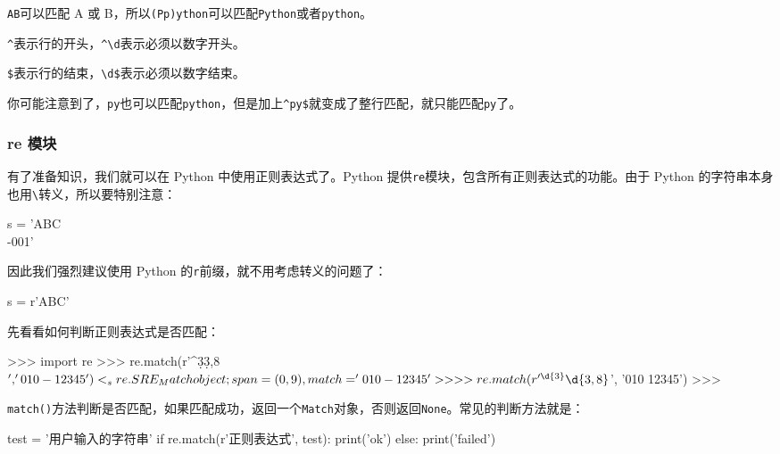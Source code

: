 \texttt{A\textbar{}B}可以匹配 A 或
B，所以\texttt{(P\textbar{}p)ython}可以匹配\texttt{\textquotesingle{}Python\textquotesingle{}}或者\texttt{\textquotesingle{}python\textquotesingle{}}。

\texttt{\^{}}表示行的开头，\texttt{\^{}\textbackslash{}d}表示必须以数字开头。

\texttt{\$}表示行的结束，\texttt{\textbackslash{}d\$}表示必须以数字结束。

你可能注意到了，\texttt{py}也可以匹配\texttt{\textquotesingle{}python\textquotesingle{}}，但是加上\texttt{\^{}py\$}就变成了整行匹配，就只能匹配\texttt{\textquotesingle{}py\textquotesingle{}}了。

\hypertarget{re-ux6a21ux5757}{%
\subsubsection{re 模块}\label{re-ux6a21ux5757}}

有了准备知识，我们就可以在 Python 中使用正则表达式了。Python
提供\texttt{re}模块，包含所有正则表达式的功能。由于 Python
的字符串本身也用\texttt{\textbackslash{}}转义，所以要特别注意：

\begin{pythoncode}
s = 'ABC\\-001' 

\end{pythoncode}

因此我们强烈建议使用 Python 的\texttt{r}前缀，就不用考虑转义的问题了：

\begin{pythoncode}
s = r'ABC' 

\end{pythoncode}

先看看如何判断正则表达式是否匹配：

\begin{pythoncode}
>>> import re
>>> re.match(r'^\d{3}\-\d{3,8}$', '010-12345')
<_sre.SRE_Match object; span=(0, 9), match='010-12345'>
>>> re.match(r'^\d{3}\-\d{3,8}$', '010 12345')
>>>
\end{pythoncode}

\texttt{match()}方法判断是否匹配，如果匹配成功，返回一个\texttt{Match}对象，否则返回\texttt{None}。常见的判断方法就是：

\begin{pythoncode}
test = '用户输入的字符串'
if re.match(r'正则表达式', test):
    print('ok')
else:
    print('failed')
\end{pythoncode}

